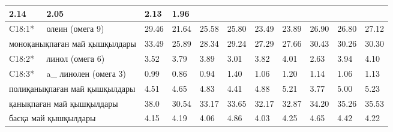 \begin{table}[]
{\begin{tabular}{|ll|lll|lll|lll|}
    2.14 &
    \multicolumn{1}{l|}{2.05} &
    \multicolumn{1}{l|}{2.13} &
    1.96 \\ \hline
  \multicolumn{1}{|l|}{C18:1*} &
    олеин (омега 9) &
    \multicolumn{1}{l|}{29.46} &
    \multicolumn{1}{l|}{21.64} &
    25.58 &
    \multicolumn{1}{l|}{25.80} &
    \multicolumn{1}{l|}{23.49} &
    23.89 &
    \multicolumn{1}{l|}{26.90} &
    \multicolumn{1}{l|}{26.80} &
    27.12 \\ \hline
  \multicolumn{2}{|l|}{моноқанықпаған май қышқылдары} &
    \multicolumn{1}{l|}{33.49} &
    \multicolumn{1}{l|}{25.89} &
    28.34 &
    \multicolumn{1}{l|}{29.24} &
    \multicolumn{1}{l|}{27.29} &
    27.66 &
    \multicolumn{1}{l|}{30.43} &
    \multicolumn{1}{l|}{30.26} &
    30.30 \\ \hline
  \multicolumn{1}{|l|}{C18:2*} &
    линол (омега 6) &
    \multicolumn{1}{l|}{3.52} &
    \multicolumn{1}{l|}{3.79} &
    3.89 &
    \multicolumn{1}{l|}{3.01} &
    \multicolumn{1}{l|}{3.82} &
    4.01 &
    \multicolumn{1}{l|}{2.63} &
    \multicolumn{1}{l|}{3.94} &
    4.10 \\ \hline
  \multicolumn{1}{|l|}{C18:3*} &
    a\_ линолен (омега 3) &
    \multicolumn{1}{l|}{0.99} &
    \multicolumn{1}{l|}{0.86} &
    0.94 &
    \multicolumn{1}{l|}{1.40} &
    \multicolumn{1}{l|}{1.06} &
    1.20 &
    \multicolumn{1}{l|}{1.14} &
    \multicolumn{1}{l|}{1.06} &
    1.13 \\ \hline
  \multicolumn{2}{|l|}{полиқанықпаған май қышқылдары} &
    \multicolumn{1}{l|}{4.51} &
    \multicolumn{1}{l|}{4.65} &
    4.83 &
    \multicolumn{1}{l|}{4.41} &
    \multicolumn{1}{l|}{4.88} &
    5.21 &
    \multicolumn{1}{l|}{3.77} &
    \multicolumn{1}{l|}{5.00} &
    5.23 \\ \hline
  \multicolumn{2}{|l|}{қанықпаған май қышқылдары} &
    \multicolumn{1}{l|}{38.0} &
    \multicolumn{1}{l|}{30.54} &
    33.17 &
    \multicolumn{1}{l|}{33.65} &
    \multicolumn{1}{l|}{32.17} &
    32.87 &
    \multicolumn{1}{l|}{34.20} &
    \multicolumn{1}{l|}{35.26} &
    35.53 \\ \hline
  \multicolumn{2}{|l|}{басқа май қышқылдары} &
    \multicolumn{1}{l|}{4.15} &
    \multicolumn{1}{l|}{4.19} &
    4.06 &
    \multicolumn{1}{l|}{4.86} &
    \multicolumn{1}{l|}{4.03} &
    4.25 &
    \multicolumn{1}{l|}{4.65} &
    \multicolumn{1}{l|}{4.42} &
    4.22 \\ \hline
  \end{tabular}
  }
  \end{table}
  



